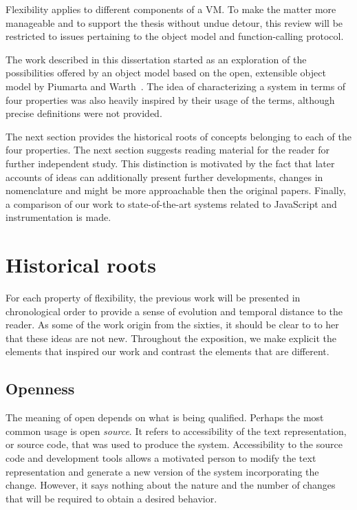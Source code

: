 Flexibility applies to different components of a VM. To make the matter more
manageable and to support the thesis without undue detour, this review will be
restricted to issues pertaining to the object model and function-calling
protocol. 

The work described in this dissertation started as an exploration of the
possibilities offered by an object model based on the open, extensible object
model by Piumarta and Warth~\cite{Piumarta:2008}. The idea of characterizing a
system in terms of four properties was also heavily inspired by their usage of
the terms, although precise definitions were not provided.

The next section provides the historical roots of concepts belonging to each of
the four properties. The next section suggests reading material for the reader
for further independent study. This distinction is motivated by the fact that
later accounts of ideas can additionally present further developments, changes
in nomenclature and might be more approachable then the original papers.
Finally, a comparison of our work to state-of-the-art systems related to
JavaScript and instrumentation is made.

\section{Historical roots}

For each property of flexibility, the previous work will be presented in
chronological order to provide a sense of evolution and temporal distance to
the reader. As some of the work origin from the sixties, it should be clear to
to her that these ideas are not new. Throughout the exposition, we make
explicit the elements that inspired our work and contrast the elements that are
different.

\subsection{Openness}

The meaning of open depends on what is being qualified. Perhaps the most common
usage is open \textit{source}. It refers to accessibility of the text
representation, or source code, that was used to produce the system.
Accessibility to the source code and development tools allows a motivated
person to modify the text representation and generate a new version of the
system incorporating the change. However, it says nothing about the nature and
the number of changes that will be required to obtain a desired behavior.


